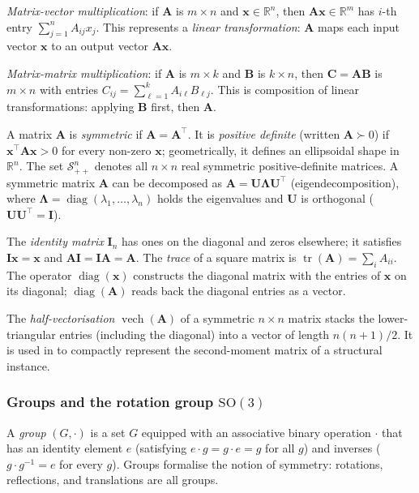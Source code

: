 \documentclass[11pt,a4paper]{article}
\theoremstyle{plain}
\theoremstyle{definition}
\theoremstyle{remark}
\newcommand{\vech}{\operatorname{vech}}
\newcommand{\tr}{\operatorname{tr}}
\newcommand{\diag}{\operatorname{diag}}
\begin{document}
\emph{Matrix-vector multiplication}: if $\mathbf{A}$ is $m \times n$
and $\mathbf{x} \in \mathbb{R}^n$, then $\mathbf{A}\mathbf{x} \in
\mathbb{R}^m$ has $i$-th entry $\sum_{j=1}^n A_{ij}x_j$. This
represents a \emph{linear transformation}: $\mathbf{A}$ maps each
input vector $\mathbf{x}$ to an output vector $\mathbf{A}\mathbf{x}$.

\emph{Matrix-matrix multiplication}: if $\mathbf{A}$ is $m \times k$
and $\mathbf{B}$ is $k \times n$, then $\mathbf{C} = \mathbf{A}\mathbf{B}$
is $m \times n$ with entries $C_{ij} = \sum_{\ell=1}^k A_{i\ell}B_{\ell j}$.
This is composition of linear transformations: applying $\mathbf{B}$
first, then $\mathbf{A}$.

A matrix $\mathbf{A}$ is \emph{symmetric} if $\mathbf{A} = \mathbf{A}^\top$.
It is \emph{positive definite} (written $\mathbf{A} \succ 0$) if
$\mathbf{x}^\top \mathbf{A} \mathbf{x} > 0$ for every non-zero
$\mathbf{x}$; geometrically, it defines an ellipsoidal shape in
$\mathbb{R}^n$. The set $\mathcal{S}^n_{++}$ denotes all $n \times n$
real symmetric positive-definite matrices. A symmetric matrix
$\mathbf{A}$ can be decomposed as $\mathbf{A} = \mathbf{U}\boldsymbol{\Lambda}\mathbf{U}^\top$
(eigendecomposition), where $\boldsymbol{\Lambda} = \diag(\lambda_1,\ldots,\lambda_n)$
holds the eigenvalues and $\mathbf{U}$ is orthogonal
($\mathbf{U}\mathbf{U}^\top = \mathbf{I}$).

The \emph{identity matrix} $\mathbf{I}_n$ has ones on the diagonal and
zeros elsewhere; it satisfies $\mathbf{I}\mathbf{x} = \mathbf{x}$ and
$\mathbf{A}\mathbf{I} = \mathbf{I}\mathbf{A} = \mathbf{A}$. The
\emph{trace} of a square matrix is $\tr(\mathbf{A}) = \sum_i A_{ii}$.
The operator $\diag(\mathbf{x})$ constructs the diagonal matrix with
the entries of $\mathbf{x}$ on its diagonal; $\diag(\mathbf{A})$ reads
back the diagonal entries as a vector.

The \emph{half-vectorisation} $\vech(\mathbf{A})$ of a symmetric
$n \times n$ matrix stacks the lower-triangular entries (including
the diagonal) into a vector of length $n(n+1)/2$. It is used in
 to compactly represent the second-moment
matrix of a structural instance.

\subsubsection{Groups and the rotation group $\mathrm{SO}(3)$}

A \emph{group} $(G, \cdot)$ is a set $G$ equipped with an associative
binary operation $\cdot$ that has an identity element $e$ (satisfying
$e \cdot g = g \cdot e = g$ for all $g$) and inverses ($g \cdot g^{-1}
= e$ for every $g$). Groups formalise the notion of symmetry:
rotations, reflections, and translations are all groups.
\end{document}
